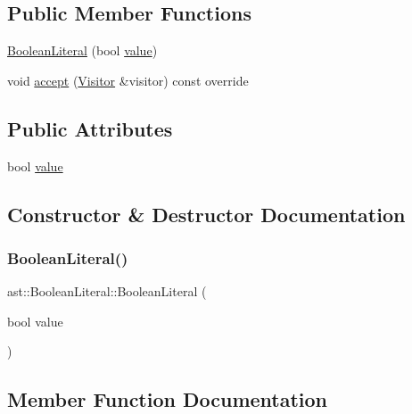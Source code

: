 \subsection*{Public Member Functions}
\begin{DoxyCompactItemize}
\item 
\hyperlink{structast_1_1_boolean_literal_a3b8e0e317c0e0ec4baf49d677d1a5ec7}{Boolean\+Literal} (bool \hyperlink{structast_1_1_boolean_literal_a439b71339c83768f2bc892f5af84c540}{value})
\item 
void \hyperlink{structast_1_1_boolean_literal_a97e132542a670b2d893b46bd2c8b6217}{accept} (\hyperlink{structast_1_1_visitor}{Visitor} \&visitor) const override
\end{DoxyCompactItemize}
\subsection*{Public Attributes}
\begin{DoxyCompactItemize}
\item 
bool \hyperlink{structast_1_1_boolean_literal_a439b71339c83768f2bc892f5af84c540}{value}
\end{DoxyCompactItemize}


\subsection{Constructor \& Destructor Documentation}
\mbox{\label{structast_1_1_boolean_literal_a3b8e0e317c0e0ec4baf49d677d1a5ec7}} 
\subsubsection{\texorpdfstring{Boolean\+Literal()}{BooleanLiteral()}}
{\footnotesize\ttfamily ast\+::\+Boolean\+Literal\+::\+Boolean\+Literal (\begin{DoxyParamCaption}\item[{bool}]{value }\end{DoxyParamCaption})\hspace{0.3cm}{\ttfamily [inline]}}



\subsection{Member Function Documentation}
\mbox{\label{structast_1_1_boolean_literal_a97e132542a670b2d893b46bd2c8b6217}} 

